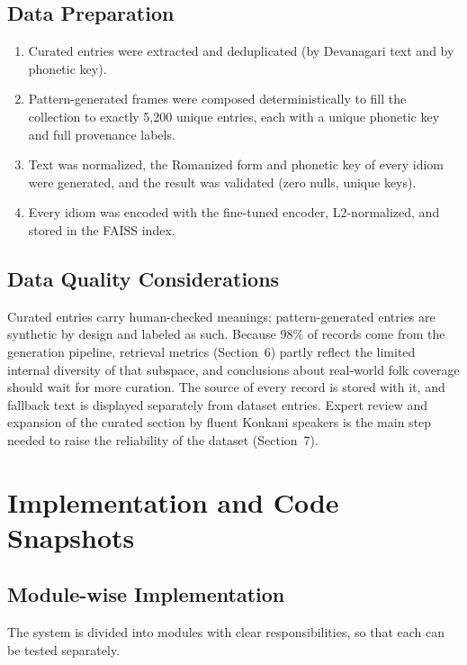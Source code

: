 \documentclass[12pt,a4paper]{article}
\let\oldsection\section
\renewcommand{\section}{\clearpage\oldsection}
\begin{document}
\subsection{Data Preparation}
\begin{enumerate}
  \item Curated entries were extracted and deduplicated (by Devanagari text and by phonetic key).
  \item Pattern-generated frames were composed deterministically to fill the collection to exactly 5,200 unique entries, each with a unique phonetic key and full provenance labels.
  \item Text was normalized, the Romanized form and phonetic key of every idiom were generated, and the result was validated (zero nulls, unique keys).
  \item Every idiom was encoded with the fine-tuned encoder, L2-normalized, and stored in the FAISS index.
\end{enumerate}

\subsection{Data Quality Considerations}
Curated entries carry human-checked meanings; pattern-generated entries are synthetic by design and labeled as such. Because 98\% of records come from the generation pipeline, retrieval metrics (Section~6) partly reflect the limited internal diversity of that subspace, and conclusions about real-world folk coverage should wait for more curation. The source of every record is stored with it, and fallback text is displayed separately from dataset entries. Expert review and expansion of the curated section by fluent Konkani speakers is the main step needed to raise the reliability of the dataset (Section~7).

\section{Implementation and Code Snapshots}

\subsection{Module-wise Implementation}
The system is divided into modules with clear responsibilities, so that each can be tested separately.
\end{document}
